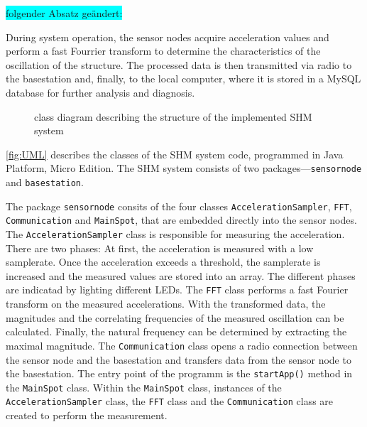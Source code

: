 \documentclass[12pt,a4paper]{scrartcl}
\begin{document}
\colorbox{cyan}{folgender Absatz geändert:}

During system operation, the sensor nodes acquire acceleration values and perform a fast Fourrier transform to determine the characteristics of the oscillation of the structure.
The processed data is then transmitted via radio to the basestation and, finally, to the local computer, where it is stored in a MySQL database for further analysis and diagnosis.


\begin{figure}[ht]
    \centering
    \caption{class diagram describing the structure of the implemented SHM system}
    \label{fig:UML}
\end{figure}

\autoref{fig:UML} describes the classes of the SHM system code, programmed in Java Platform, Micro Edition. 
The SHM system consists of two packages---\texttt{sensornode} and \texttt{basestation}.

The package \texttt{sensornode} consits of the four classes \texttt{Acceleration\-Sampler}, \texttt{FFT}, \texttt{Communication} and \texttt{MainSpot}, that are embedded directly into the sensor nodes.
The \texttt{AccelerationSampler} class is responsible for measuring the acceleration.
There are two phases: At first, the acceleration is measured with a low samplerate.
Once the acceleration exceeds a threshold, the samplerate is increased and the measured values are stored into an array.
The different phases are indicatad by lighting different LEDs.
The \texttt{FFT} class performs a fast Fourier transform on the measured accelerations. 
With the transformed data, the magnitudes and the correlating frequencies of the measured oscillation can be calculated.
Finally, the natural frequency can be determined by extracting the maximal magnitude.
The \texttt{Communication} class opens a radio connection between the sensor node and the basestation and transfers data from the sensor node to the basestation.
The entry point of the programm is the \texttt{startApp()} method in the \texttt{MainSpot} class. 
Within the \texttt{MainSpot} class, instances of the \texttt{Acceleration\-Sampler} class, the \texttt{FFT} class and the \texttt{Communication} class are created to perform the measurement.
\end{document}

